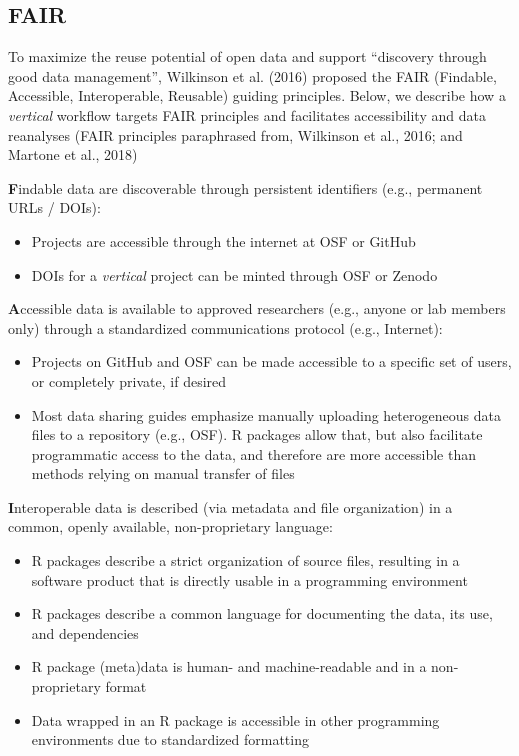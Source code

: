 \documentclass[
  english,
  jou,floatsintext]{apa6}
\providecommand{\tightlist}{%
  \setlength{\itemsep}{0pt}\setlength{\parskip}{0pt}}
\begin{document}
\hypertarget{fair}{%
\subsection{FAIR}\label{fair}}

To maximize the reuse potential of open data and support ``discovery through good data management'', Wilkinson et al. (2016) proposed the FAIR (Findable, Accessible, Interoperable, Reusable) guiding principles. Below, we describe how a \emph{vertical} workflow targets FAIR principles and facilitates accessibility and data reanalyses (FAIR principles paraphrased from, Wilkinson et al., 2016; and Martone et al., 2018)

\textbf{F}indable data are discoverable through persistent identifiers (e.g., permanent URLs / DOIs):

\begin{itemize}
\tightlist
\item
  Projects are accessible through the internet at OSF or GitHub
\item
  DOIs for a \emph{vertical} project can be minted through OSF or Zenodo
\end{itemize}

\textbf{A}ccessible data is available to approved researchers (e.g., anyone or lab members only) through a standardized communications protocol (e.g., Internet):

\begin{itemize}
\tightlist
\item
  Projects on GitHub and OSF can be made accessible to a specific set of users, or completely private, if desired
\item
  Most data sharing guides emphasize manually uploading heterogeneous data files to a repository (e.g., OSF). R packages allow that, but also facilitate programmatic access to the data, and therefore are more accessible than methods relying on manual transfer of files
\end{itemize}

\textbf{I}nteroperable data is described (via metadata and file organization) in a common, openly available, non-proprietary language:

\begin{itemize}
\tightlist
\item
  R packages describe a strict organization of source files, resulting in a software product that is directly usable in a programming environment
\item
  R packages describe a common language for documenting the data, its use, and dependencies
\item
  R package (meta)data is human- and machine-readable and in a non-proprietary format
\item
  Data wrapped in an R package is accessible in other programming environments due to standardized formatting
\end{itemize}
\end{document}
